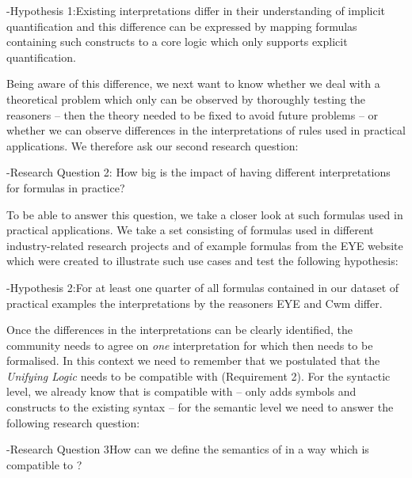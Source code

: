 \hyp{\hypertarget{h2}{Hypothesis 1:}}{Existing interpretations differ in their understanding of implicit quantification and this difference can be 
expressed by mapping formulas containing such constructs to a core logic which only supports explicit quantification.}

Being aware of this difference, we next want to know whether we deal with a theoretical problem which only can be observed by thoroughly testing the reasoners 
-- then the theory needed to be fixed to avoid future problems -- or whether we can observe differences in the interpretations of \nthree 
rules used in practical applications. We therefore ask our second research question:

\hyp{\hypertarget{rq3}{Research Question 2:}}{
How big is the impact of having different interpretations for \nthree formulas in practice?
}

To be able to answer this question, we take a closer look at such \nthree formulas used in practical applications. We take a set consisting of formulas used in different industry-related 
research projects and of example formulas from the EYE website which were created to illustrate such use cases and test the following hypothesis:

\hyp{Hypothesis 2:}{For at least one quarter of all \nthree formulas contained in our dataset of practical examples the interpretations by the reasoners EYE and Cwm differ.}

Once the differences in the interpretations can be clearly identified, the community needs to agree on \emph{one} interpretation for \nthreelogic which then needs 
to be formalised. In this context we need to remember that we postulated that the \emph{Unifying Logic} needs to be compatible with \rdf (Requirement 2).
% 
For the syntactic level, we already know that \nthree is compatible with \rdf{} -- \nthree only adds symbols and constructs to the existing \rdf syntax --
for the semantic level we need to answer the following research question:

\hyp{Research Question 3}{How can we define the semantics of \nthreelogic in a way which is compatible to \rdf?}

